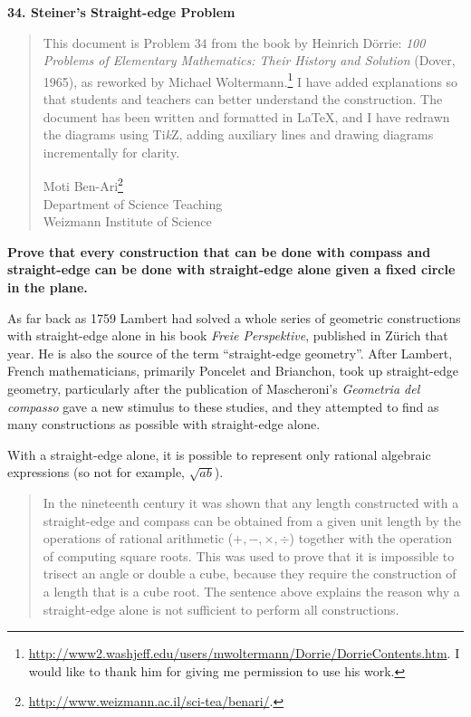 \documentclass[11pt,a4paper]{article}
\begin{document}
\textbf{\LARGE 34. Steiner's Straight-edge Problem}

\begin{quote}
This document is Problem $34$ from the book by Heinrich D\"{o}rrie: \textit{100 Problems of Elementary Mathematics: Their History and Solution} (Dover, 1965), as reworked by Michael Woltermann.\footnote{\url{http://www2.washjeff.edu/users/mwoltermann/Dorrie/DorrieContents.htm}. I would like to thank him for giving me permission to use his work.} I have added explanations so that students and teachers can better understand the construction. The document has been written and formatted in \LaTeX{}, and I have redrawn the diagrams using Ti\textit{k}Z, adding auxiliary lines and  drawing diagrams incrementally for clarity.

Moti Ben-Ari\footnote{\url{http://www.weizmann.ac.il/sci-tea/benari/}.}\\
Department of Science Teaching\\
Weizmann Institute of Science
\end{quote}

\bigskip

\textbf{Prove that every construction that can be done with compass and straight-edge can be done with straight-edge alone given a fixed circle in the plane.}

As far back as 1759 Lambert had solved a whole series of geometric constructions with straight-edge alone in his book \textit{Freie Perspektive}, published in Z\"{u}rich that year. He is also the source of the term ``straight-edge geometry''. After Lambert, French mathematicians, primarily Poncelet and Brianchon, took up straight-edge geometry, particularly after the publication of Mascheroni's \textit{Geometria del compasso} gave a new stimulus to these studies, and they attempted to find as many constructions as possible with straight-edge alone. 

With a straight-edge alone, it is possible to represent only rational algebraic expressions (so not for example, $\sqrt{ab}$).
\begin{quote}
In the nineteenth century it was shown that any length constructed with a straight-edge and compass can be obtained from a given unit length by the operations of rational arithmetic ($+,-,\times,\div$) together with the operation of computing square roots. This was used to prove that it is impossible to trisect an angle or double a cube, because they require the construction of a length that is a cube root. The sentence above explains the reason why a straight-edge alone is not sufficient to perform all constructions. 
\end{quote}
\end{document}
